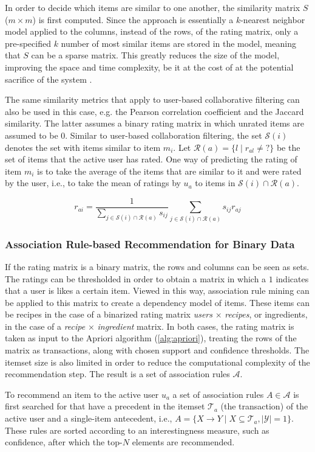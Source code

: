 In order to decide which items are similar to one another, the similarity matrix $S$ ($m \times m$) is first computed.
Since the approach is essentially a $k$-nearest neighbor model applied to the columns, instead of the rows, of the rating matrix, only a pre-specified $k$ number of most similar items are stored in the model, meaning that $S$ can be a sparse matrix.
This greatly reduces the size of the model, improving the space and time complexity, be it at the cost of at the potential sacrifice of the system \citep{Sarwar2001}.

The same similarity metrics that apply to user-based collaborative filtering can also be used in this case, e.g. the Pearson correlation coefficient and the Jaccard similarity.
The latter assumes a binary rating matrix in which unrated items are assumed to be $0$.
Similar to user-based collaboration filtering, the set $\mathcal{S}(i)$ denotes the set with items similar to item $m_i$.
Let $\mathcal{R}(a)=\{l \mid r_{al} \neq {?}\}$ be the set of items that the active user has rated.
One way of predicting the rating of item $m_i$ is to take the average of the items that are similar to it and were rated by the user, i.e., to take the mean of ratings by $u_a$ to items in $\mathcal{S}(i) \cap \mathcal{R}(a)$.

\begin{equation}
	r_{ai}=\frac{1}{\sum_{j\in{\mathcal{S}(i)\cap \mathcal{R}(a)}}s_{ij}}\sum_{j\in{\mathcal{S}(i)\cap \mathcal{R}(a)}}s_{ij}r_{aj}
\end{equation}




\subsubsection{Association Rule-based Recommendation for Binary Data}
\label{subsubsec:association_recommendation}

If the rating matrix is a binary matrix, the rows and columns can be seen as sets.
The ratings can be thresholded in order to obtain a matrix in which a $1$ indicates that a user is likes a certain item.
Viewed in this way, association rule mining can be applied to this matrix to create a dependency model of items.
These items can be recipes in the case of a binarized rating matrix \emph{users} $\times$ \emph{recipes}, or ingredients, in the case of a \emph{recipe} $\times$ \emph{ingredient} matrix.
In both cases, the rating matrix is taken as input to the Apriori algorithm (\cref{alg:apriori}), treating the rows of the matrix as transactions, along with chosen support and confidence thresholds.
The itemset size is also limited in order to reduce the computational complexity of the recommendation step.
The result is a set of association rules $\mathcal{A}$.

To recommend an item to the active user $u_a$ a set of association rules $A \in \mathcal{A}$ is first searched for that have a precedent in the itemset $\mathcal{T}_a$ (the transaction) of the active user and a single-item antecedent, i.e., $A = \{X \rightarrow Y \mid X \subseteq \mathcal{T}_a, |\mathcal{Y}|=1\}$.
These rules are sorted according to an interestingness measure, such as confidence, after which the top-$N$ elements are recommended.